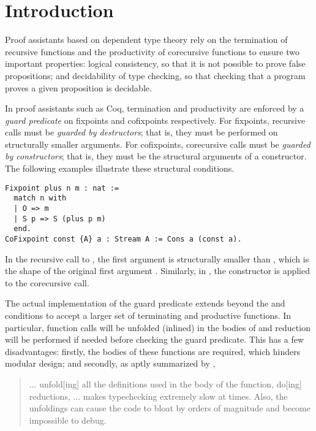 \section{Introduction}\label{sec:intro}

Proof assistants based on dependent type theory rely on the termination of recursive functions and the productivity of corecursive functions to ensure two important properties: logical consistency, so that it is not possible to prove false propositions; and decidability of type checking, so that checking that a program proves a given proposition is decidable.

In proof assistants such as Coq, termination and productivity are enforced by a \emph{guard predicate} on fixpoints and cofixpoints respectively.
For fixpoints, recursive calls must be \emph{guarded by destructors}; that is, they must be performed on structurally smaller arguments.
For cofixpoints, corecursive calls must be \emph{guarded by constructors}; that is, they must be the structural arguments of a constructor.
The following examples illustrate these structural conditions.

\begin{verbatim}
Fixpoint plus n m : nat :=
  match n with
  | O => m
  | S p => S (plus p m)
  end.
CoFixpoint const {A} a : Stream A := Cons a (const a).
\end{verbatim}

In the recursive call to , the first argument  is structurally smaller than , which is the shape of the original first argument . Similarly, in , the constructor  is applied to the corecursive call.

The actual implementation of the guard predicate extends beyond the \guardedbydestructors and \guardedbyconstructors conditions
to accept a larger set of terminating and productive functions.
In particular, function calls will be unfolded (\ie inlined) in the bodies of \cofixpoints
and reduction will be performed if needed before checking the guard predicate.
This has a few disadvantages:
firstly, the bodies of these functions are required, which hinders modular design;
and secondly, as aptly summarized by \citet{coqterm},

\begin{quote}
  ... unfold[ing] all the definitions used in the body of the function, do[ing] reductions, \etc
  ... makes typechecking extremely slow at times.
  Also, the unfoldings can cause the code to bloat by orders of magnitude and become impossible to debug.
\end{quote}

